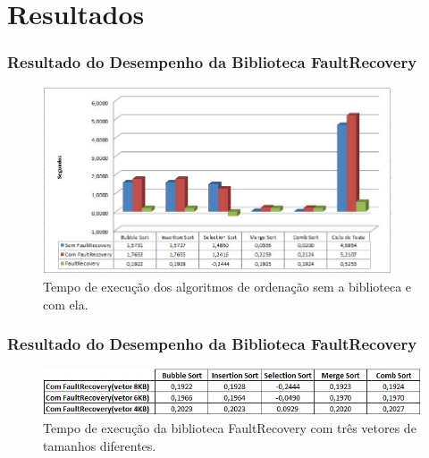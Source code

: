 
\section{Resultados} \label{Sec:Resultados}

\begin{frame}
	\frametitle{Resultado do Desempenho da Biblioteca FaultRecovery}
	\begin{figure}
		\begin{center}\includegraphics[width=0.92\textwidth]{./figuras/tempoRecovery.png}\end{center}
		\caption{Tempo de execução dos algoritmos de ordenação sem a biblioteca e com ela.}
	\end{figure}
\end{frame}

\begin{frame}
	\frametitle{Resultado do Desempenho da Biblioteca FaultRecovery}
	\begin{figure}
		\begin{center}\includegraphics[width=1.0\textwidth]{./figuras/tempoRecovery2.png}\end{center}
		\caption{Tempo de execução da biblioteca FaultRecovery com três	vetores de tamanhos diferentes.}
	\end{figure}
\end{frame}


